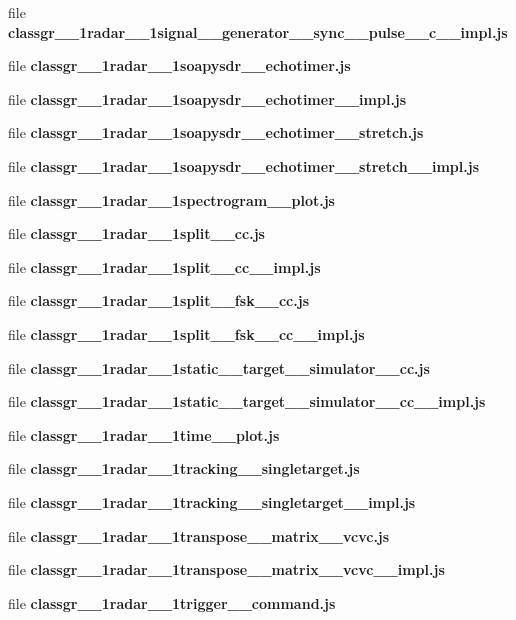 \begin{DoxyCompactItemize}
\item 
file {\bf classgr\+\_\+\_\+1radar\+\_\+\_\+1signal\+\_\+\+\_\+generator\+\_\+\+\_\+sync\+\_\+\+\_\+pulse\+\_\+\+\_\+c\+\_\+\+\_\+impl.\+js}
\item 
file {\bf classgr\+\_\+\_\+1radar\+\_\+\_\+1soapysdr\+\_\+\+\_\+echotimer.\+js}
\item 
file {\bf classgr\+\_\+\_\+1radar\+\_\+\_\+1soapysdr\+\_\+\+\_\+echotimer\+\_\+\+\_\+impl.\+js}
\item 
file {\bf classgr\+\_\+\_\+1radar\+\_\+\_\+1soapysdr\+\_\+\+\_\+echotimer\+\_\+\+\_\+stretch.\+js}
\item 
file {\bf classgr\+\_\+\_\+1radar\+\_\+\_\+1soapysdr\+\_\+\+\_\+echotimer\+\_\+\+\_\+stretch\+\_\+\+\_\+impl.\+js}
\item 
file {\bf classgr\+\_\+\_\+1radar\+\_\+\_\+1spectrogram\+\_\+\+\_\+plot.\+js}
\item 
file {\bf classgr\+\_\+\_\+1radar\+\_\+\_\+1split\+\_\+\+\_\+cc.\+js}
\item 
file {\bf classgr\+\_\+\_\+1radar\+\_\+\_\+1split\+\_\+\+\_\+cc\+\_\+\+\_\+impl.\+js}
\item 
file {\bf classgr\+\_\+\_\+1radar\+\_\+\_\+1split\+\_\+\+\_\+fsk\+\_\+\+\_\+cc.\+js}
\item 
file {\bf classgr\+\_\+\_\+1radar\+\_\+\_\+1split\+\_\+\+\_\+fsk\+\_\+\+\_\+cc\+\_\+\+\_\+impl.\+js}
\item 
file {\bf classgr\+\_\+\_\+1radar\+\_\+\_\+1static\+\_\+\+\_\+target\+\_\+\+\_\+simulator\+\_\+\+\_\+cc.\+js}
\item 
file {\bf classgr\+\_\+\_\+1radar\+\_\+\_\+1static\+\_\+\+\_\+target\+\_\+\+\_\+simulator\+\_\+\+\_\+cc\+\_\+\+\_\+impl.\+js}
\item 
file {\bf classgr\+\_\+\_\+1radar\+\_\+\_\+1time\+\_\+\+\_\+plot.\+js}
\item 
file {\bf classgr\+\_\+\_\+1radar\+\_\+\_\+1tracking\+\_\+\+\_\+singletarget.\+js}
\item 
file {\bf classgr\+\_\+\_\+1radar\+\_\+\_\+1tracking\+\_\+\+\_\+singletarget\+\_\+\+\_\+impl.\+js}
\item 
file {\bf classgr\+\_\+\_\+1radar\+\_\+\_\+1transpose\+\_\+\+\_\+matrix\+\_\+\+\_\+vcvc.\+js}
\item 
file {\bf classgr\+\_\+\_\+1radar\+\_\+\_\+1transpose\+\_\+\+\_\+matrix\+\_\+\+\_\+vcvc\+\_\+\+\_\+impl.\+js}
\item 
file {\bf classgr\+\_\+\_\+1radar\+\_\+\_\+1trigger\+\_\+\+\_\+command.\+js}

\end{DoxyCompactItemize}
